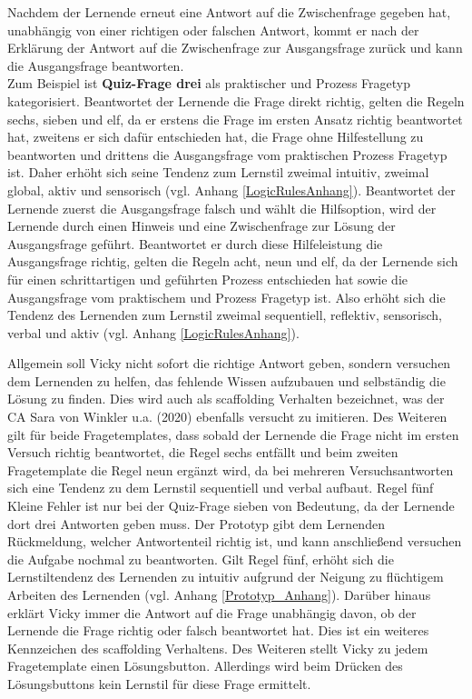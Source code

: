Nachdem der Lernende erneut eine Antwort auf die Zwischenfrage gegeben hat, unabhängig von einer richtigen oder falschen Antwort,
kommt er nach der Erklärung der Antwort auf die Zwischenfrage zur Ausgangsfrage zurück und kann die Ausgangsfrage beantworten.\\
Zum Beispiel ist \textbf{Quiz-Frage drei} als praktischer und Prozess Fragetyp kategorisiert.
Beantwortet der Lernende die Frage direkt richtig, 
gelten die Regeln sechs, sieben und elf, da er erstens die Frage im ersten Ansatz richtig beantwortet hat, zweitens er sich dafür entschieden hat, die Frage ohne Hilfestellung
zu beantworten und drittens die Ausgangsfrage vom praktischen Prozess Fragetyp ist. Daher erhöht sich seine Tendenz zum Lernstil zweimal intuitiv, zweimal global, 
aktiv und sensorisch (vgl. Anhang \ref{LogicRulesAnhang}).
Beantwortet der Lernende zuerst die Ausgangsfrage falsch und wählt die Hilfsoption,
wird der Lernende durch einen Hinweis und eine Zwischenfrage zur Lösung der Ausgangsfrage 
geführt. Beantwortet er durch diese Hilfeleistung die Ausgangsfrage richtig, gelten die Regeln acht, neun und elf, da
der Lernende sich für einen schrittartigen und geführten 
Prozess entschieden hat sowie die Ausgangsfrage vom praktischem und Prozess Fragetyp ist. 
Also erhöht sich die Tendenz des 
Lernenden zum Lernstil zweimal sequentiell, reflektiv, sensorisch, verbal und aktiv (vgl. Anhang \ref{LogicRulesAnhang}).


Allgemein soll Vicky nicht sofort die richtige Antwort geben, sondern versuchen dem Lernenden zu helfen, 
das fehlende Wissen aufzubauen und selbständig die Lösung zu finden.
Dies wird auch als scaffolding Verhalten bezeichnet, 
was der CA Sara von Winkler u.a. (2020) ebenfalls versucht zu imitieren.
Des Weiteren gilt für beide Fragetemplates, dass sobald der Lernende die Frage nicht im ersten Versuch richtig beantwortet, die Regel sechs entfällt und beim 
zweiten Fragetemplate die Regel neun ergänzt wird, da bei mehreren Versuchsantworten sich eine Tendenz zu dem Lernstil sequentiell und verbal aufbaut.
Regel fünf \glqq Kleine Fehler\grqq{} ist nur bei der Quiz-Frage sieben von Bedeutung, da der Lernende dort drei Antworten geben muss.
Der Prototyp gibt dem Lernenden Rückmeldung, welcher Antwortenteil richtig ist, und kann anschließend versuchen die Aufgabe 
nochmal zu beantworten. Gilt Regel fünf, erhöht sich die Lernstiltendenz des Lernenden zu intuitiv aufgrund der Neigung
zu flüchtigem Arbeiten des Lernenden (vgl. Anhang \ref{Prototyp_Anhang}).
Darüber hinaus erklärt Vicky immer die Antwort auf die Frage unabhängig davon, ob der Lernende 
die Frage richtig oder falsch beantwortet hat. Dies ist ein weiteres Kennzeichen des scaffolding Verhaltens. \parencite[4 f.]{winkler_hobert_salovaara_söllner_leimeister_2020}
Des Weiteren stellt Vicky zu jedem Fragetemplate einen Lösungsbutton. Allerdings wird beim Drücken des Lösungsbuttons kein 
Lernstil für diese Frage ermittelt. 

